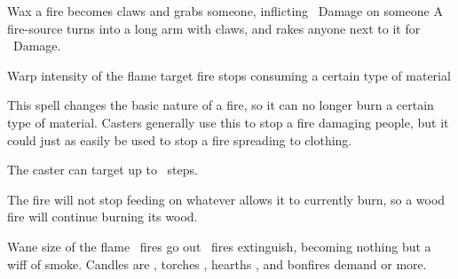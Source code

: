   {\mFire}%
  {Wax}%
  {\detailed}%
  {}%
  {a fire becomes claws and grabs someone, inflicting \rollConv\ Damage on someone}%
  {
    A fire-source turns into a long arm with claws, and rakes anyone next to it for \rollConv~Damage.
  }

  {\mFire}%
  {Warp}%
  {\duplicated}%
  {intensity of the flame}%
  {target fire stops consuming a certain type of material}%
  {
    This spell changes the basic nature of a fire, so it can no longer burn a certain type of material.
    Casters generally use this to stop a fire damaging people, but it could just as easily be used to stop a fire spreading to clothing.

    The caster can target up to \spellArea\ steps.

    The fire will not stop feeding on whatever allows it to currently burn, so a wood fire will continue burning its wood.
  }

  {\mFire}%
  {Wane}%
  {\duplicated}%
  {size of the flame}%
  {\spellArea\ fires go out}%
  {
    \spellArea\ fires extinguish, becoming nothing but a wiff of smoke.
    Candles are , torches , hearths , and bonfires demand  or more.
  }
